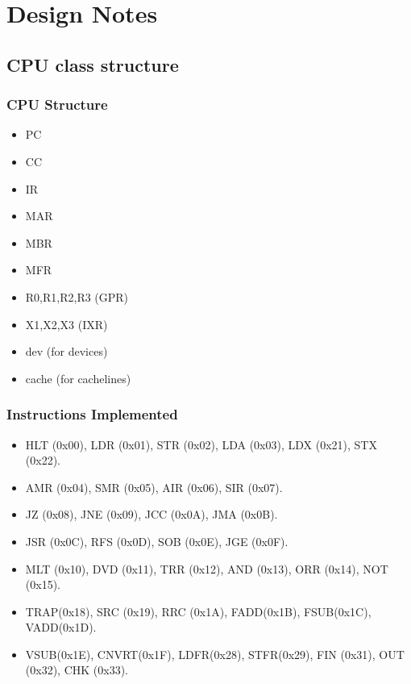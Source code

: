 \documentclass[10pt]{article}
\begin{document}
\section{Design Notes}
\subsection{CPU class structure}
\subsubsection{CPU Structure}
\begin{itemize}
  \item PC
  \item CC
  \item IR
  \item MAR
  \item MBR
  \item MFR
  \item R0,R1,R2,R3 (GPR)
  \item X1,X2,X3 (IXR)
  \item dev (for devices)
  \item cache (for cachelines)
\end{itemize}
\subsubsection{Instructions Implemented}
\begin{itemize}
  \item HLT (0x00), LDR (0x01), STR (0x02), LDA (0x03), LDX (0x21), STX (0x22).
  \item AMR (0x04), SMR (0x05), AIR (0x06), SIR (0x07).
  \item JZ  (0x08), JNE (0x09), JCC (0x0A), JMA (0x0B).
  \item JSR (0x0C), RFS (0x0D), SOB (0x0E), JGE (0x0F).
  \item MLT (0x10), DVD (0x11), TRR (0x12), AND (0x13), ORR (0x14), NOT (0x15).
  \item TRAP(0x18), SRC (0x19), RRC (0x1A), FADD(0x1B), FSUB(0x1C), VADD(0x1D).
  \item VSUB(0x1E), CNVRT(0x1F), LDFR(0x28), STFR(0x29), FIN  (0x31), OUT (0x32), CHK (0x33).
\end{itemize}
\end{document}
